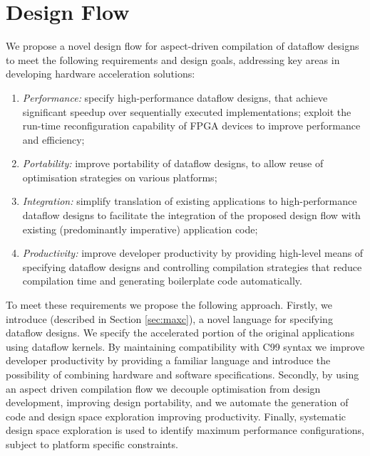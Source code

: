 \section{Design Flow}
\label{sec:design-flow}

We propose a novel design flow for aspect-driven compilation of
dataflow designs to meet the following requirements and design goals,
addressing key areas in developing hardware acceleration solutions:
\begin{enumerate}
\item \emph{Performance:} specify high-performance dataflow designs,
  that achieve significant speedup over sequentially executed
  implementations; exploit the run-time reconfiguration capability of
  FPGA devices to improve performance and efficiency;
\item \emph{Portability:} improve portability of dataflow designs, to
  allow reuse of optimisation strategies on various platforms;
\item \emph{Integration:} simplify translation of existing
  applications to high-performance dataflow designs to facilitate the
  integration of the proposed design flow with existing (predominantly
  imperative) application code;
\item \emph{Productivity:} improve developer productivity by providing
  high-level means of specifying dataflow designs and controlling
  compilation strategies that reduce compilation time and generating
  boilerplate code automatically.
\end{enumerate}

To meet these requirements we propose the following approach. Firstly,
we introduce \MAXC{} (described in Section \ref{sec:maxc}), a novel
language for specifying dataflow designs. We specify the accelerated
portion of the original applications using \MAXC{} dataflow
kernels. By maintaining compatibility with C99 syntax we improve
developer productivity by providing a familiar language and introduce
the possibility of combining hardware and software
specifications. Secondly, by using an aspect driven compilation flow
we decouple optimisation from design development, improving design
portability, and we automate the generation of code and design space
exploration improving productivity. Finally, systematic design space
exploration is used to identify maximum performance configurations,
subject to platform specific constraints.

